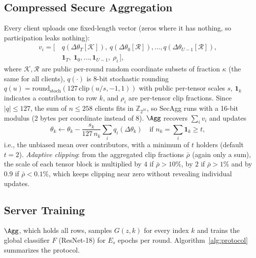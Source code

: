 \subsection{Compressed Secure Aggregation}
Every client uploads one fixed-length vector (zeros where it has nothing, so participation leaks
nothing):
\begin{align*}
  v_i=\big[\,&q(\Delta\theta_T[\mathcal{K}]),\ q(\Delta\theta_0[\mathcal{R}]),\dots,
  q(\Delta\theta_{U-1}[\mathcal{R}]),\\
  &\mathbf{1}_{T},\ \mathbf{1}_0,\dots,\mathbf{1}_{U-1},\ \rho_i\,\big],
\end{align*}
where $\mathcal{K},\mathcal{R}$ are public per-round random coordinate subsets of fraction
$\kappa$ (the same for all clients), $q(\cdot)$ is 8-bit stochastic rounding
$q(u)=\mathrm{round}_{\mathrm{stoch}}(127\,\mathrm{clip}(u/s,-1,1))$ with public per-tensor scales $s$,
$\mathbf{1}_k$ indicates a contribution to row $k$, and $\rho_i$ are per-tensor clip fractions.
Since $|q|\le127$, the sum of $n\le258$ clients fits in $\mathbb{Z}_{2^{16}}$, so SecAgg runs with a
16-bit modulus (2 bytes per coordinate instead of 8). $\Agg$ recovers
$\sum_i v_i$ and updates
\[
  \theta_k \leftarrow \theta_k - \frac{s_k}{127\,n_k}\sum_i q_i(\Delta\theta_k)
  \quad\text{if } n_k=\textstyle\sum_i \mathbf{1}_k \ge t,
\]
i.e., the unbiased mean over contributors, with a minimum of $t$ holders (default $t=2$).
\emph{Adaptive clipping}: from the aggregated clip fractions $\bar\rho$ (again only a sum), the scale
of each tensor block is multiplied by $4$ if $\bar\rho>10\%$, by $2$ if $\bar\rho>1\%$ and by $0.9$
if $\bar\rho<0.1\%$, which keeps clipping near zero without revealing individual updates.

\subsection{Server Training}
$\Agg$, which holds all rows, samples $G(z,k)$ for every index $k$ and trains the global classifier $F$
(ResNet-18) for $E_s$ epochs per round. Algorithm~\ref{alg:protocol} summarizes the protocol.

